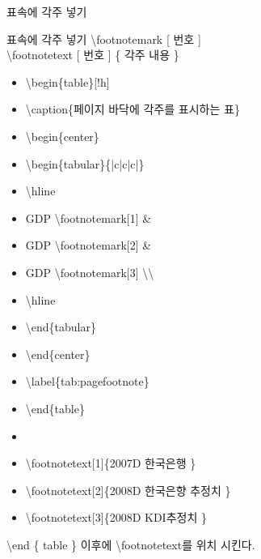\documentclass[ aspectratio=149,  14pt,blue,xcolor=pdftex,dvipsnames,table,handout,notes]{beamer}
\begin{document}
		\begin{frame}[t,shrink=0]{표속에 각주 넣기}

			\begin{block} {표속에 각주 넣기}
			\textbackslash footnotemark [ 번호 ] \\
			\textbackslash footnotetext [ 번호 ] \{ 각주 내용 \}
			\end{block}

			\begin{example}
			\begin{itemize}
				\item[]	\textbackslash begin\{table\}[!h]
				\item[]	\textbackslash caption\{페이지 바닥에 각주를 표시하는 표\}
				\item[]	\textbackslash begin\{center\}
				\item[]	\textbackslash begin\{tabular\}\{|c|c|c|\}
				\item[]	\textbackslash hline
				\item[]	GDP \textbackslash footnotemark[1] \&
				\item[]	GDP \textbackslash footnotemark[2] \&
				\item[]	GDP \textbackslash footnotemark[3] \textbackslash \textbackslash
				\item[]	\textbackslash hline
				\item[]	\textbackslash end\{tabular\}
				\item[]	\textbackslash end\{center\}
				\item[]	\textbackslash label\{tab:pagefootnote\}
				\item[]	\textbackslash end\{table\}
				\item[]	
				\item[]	\textbackslash footnotetext[1]\{2007D 한국은행 \}
				\item[]	\textbackslash footnotetext[2]\{2008D 한국은향 추정치 \}
				\item[]	\textbackslash footnotetext[3]\{2008D KDI추정치 \}
			\end{itemize}
			\end{example}



		\textbackslash end \{ table \} 이후에 \textbackslash footnotetext를 위치 시킨다. 

		\end{frame}
\end{document}
